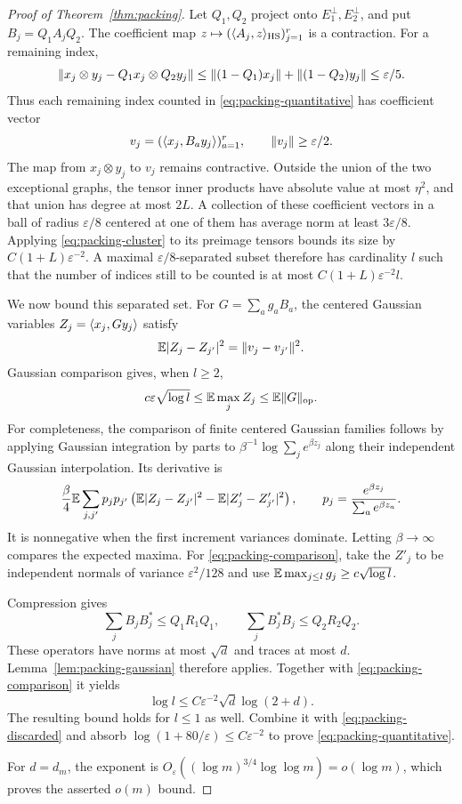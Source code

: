 \begin{proof}[Proof of Theorem~\ref{thm:packing}]
Let $Q_1,Q_2$ project onto $E_1^\perp,E_2^\perp$, and put
$B_j=Q_1A_jQ_2$.  The coefficient map
$z\mapsto(\langle A_j,z\rangle_{\rm HS})_{j=1}^r$ is a contraction.
For a remaining index,
\[
 \lVert x_j\otimes y_j-Q_1x_j\otimes Q_2y_j\rVert
 \le\lVert(1-Q_1)x_j\rVert+\lVert(1-Q_2)y_j\rVert
 \le\varepsilon/5.
\]
Thus each remaining index counted in
\eqref{eq:packing-quantitative} has coefficient vector
\[
 v_j=(\langle x_j,B_ay_j\rangle)_{a=1}^r,
 \qquad\lVert v_j\rVert\ge\varepsilon/2.
\]
The map from $x_j\otimes y_j$ to $v_j$ remains contractive.
Outside the union of the two exceptional graphs, the tensor inner
products have absolute value at most $\eta^2$, and that union has
degree at most $2L$.  A collection of these coefficient vectors in a
ball of radius $\varepsilon/8$ centered at one of them has average
norm at least $3\varepsilon/8$.  Applying
\eqref{eq:packing-cluster} to its preimage tensors bounds its size by
$C(1+L)\varepsilon^{-2}$.  A maximal $\varepsilon/8$-separated subset
therefore has cardinality $l$ such that the number of indices still
to be counted is at most $C(1+L)\varepsilon^{-2}l$.

We now bound this separated set.  For $G=\sum_ag_aB_a$, the centered
Gaussian variables $Z_j=\langle x_j,Gy_j\rangle$ satisfy
\[
 \mathbb E|Z_j-Z_{j'}|^2=\lVert v_j-v_{j'}\rVert^2.
\]
Gaussian comparison gives, when $l\ge2$,
\begin{equation}\label{eq:packing-comparison}
 c\varepsilon\sqrt{\log l}
       \le\mathbb E\max_j Z_j\le\mathbb E\lVert G\rVert_{\rm op}.
\end{equation}
For completeness, the comparison of finite centered Gaussian families
follows by applying Gaussian integration by parts to
$\beta^{-1}\log\sum_j e^{\beta z_j}$ along their independent Gaussian
interpolation.  Its derivative is
\[
 \frac\beta4\mathbb E\sum_{j,j'}p_jp_{j'}
 \left(\mathbb E|Z_j-Z_{j'}|^2-\mathbb E|Z'_j-Z'_{j'}|^2\right),
 \qquad p_j=\frac{e^{\beta z_j}}{\sum_a e^{\beta z_a}}.
\]
It is nonnegative when the first increment variances dominate.
Letting $\beta\to\infty$ compares the expected maxima.  For
\eqref{eq:packing-comparison}, take the $Z'_j$ to be independent
normals of variance $\varepsilon^2/128$ and use
$\mathbb E\max_{j\le l}g_j\ge c\sqrt{\log l}$.

Compression gives
\[
 \sum_jB_jB_j^*\le Q_1R_1Q_1,\qquad
 \sum_jB_j^*B_j\le Q_2R_2Q_2.
\]
These operators have norms at most $\sqrt d$ and traces at most $d$.
Lemma~\ref{lem:packing-gaussian} therefore applies.  Together with
\eqref{eq:packing-comparison} it yields
\[
 \log l\le C\varepsilon^{-2}\sqrt d\log(2+d).
\]
The resulting bound holds for $l\le1$ as well.  Combine it with
\eqref{eq:packing-discarded} and absorb
$\log(1+80/\varepsilon)\le C\varepsilon^{-2}$ to prove
\eqref{eq:packing-quantitative}.

For $d=d_m$, the exponent is
$O_\varepsilon((\log m)^{3/4}\log\log m)=o(\log m)$,
which proves the asserted $o(m)$ bound.
\end{proof}

